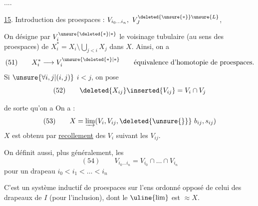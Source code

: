 ....

\uline{15}. Introduction des proespaces :
$V_{i_0\ldots i_n},\ V_J^{\deleted{\unsure{*}}\unsure{L}}$,

On désigne par $V_i^{\unsure{\deleted{*}|*}}$ le
voisinage tubulaire (au sens des proespaces)
de $X_i^*=X_i\setminus\bigcup_{j<i}X_j$ dans $X$.
Ainsi,  on a
\[
(51)\qquad X_i^*\longrightarrow V_i^{\unsure{\deleted{*}|*}}
\qquad\text{équivalence d'homotopie de proespaces.}
\]
Si $\unsure{\forall i,j|(i,j)}$ $i<j$, on pose
\[
(52)\qquad\deleted{X_{ij}}\inserted{V_{ij}}=V_i\cap V_j
\]


de sorte qu'on a
On a :
\[
(53)\qquad X=\varinjlim(V_i,V_{ij},\deleted{\unsure{\}}}\ b_{ij},s_{ij})
\]
$X$ est obtenu par \uline{recollement} des $V_i$ suivant les $V_{ij}$.

On définit aussi, plus généralement, les
\[
(54)\qquad V_{i_0\ldots i_n}=V_{i_0}\cap\ldots\cap V_{i_n}
\]
pour un drapeau $i_0<i_1<\ldots<i_n$

C'est un système inductif de  proespaces
sur l'ens ordonné opposé de celui des drapeaux de $I$
(pour l'inclusion), dont le $\uline{\lim}$ est  $\approx X$.

